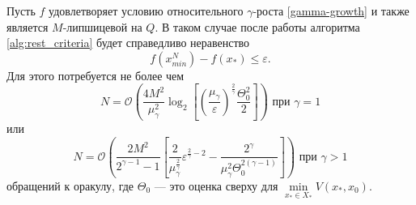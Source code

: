     \begin{theorem}
        Пусть $f$ удовлетворяет условию относительного $\gamma$-роста \eqref{gamma-growth} и также является $M$-липшицевой на $Q$. В таком случае после работы алгоритма \ref{alg:rest_criteria} будет справедливо неравенство
        \begin{equation}
            f(x_{min}^N) - f(x_*) \leq \varepsilon.
        \end{equation}
        Для этого потребуется не более чем
        \begin{equation}
           N = \mathcal{O} \left( \frac{4 M^2}{\mu_{\gamma}^2} \log_2{\left[\left(\frac{\mu_{\gamma}}{\varepsilon}\right)^{\frac{2}{\gamma}} \frac{\Theta_0^2}{2}\right]}\right) \text{ при } \gamma = 1
        \end{equation}
        или
        \begin{equation}
           N = \mathcal{O}\left( \frac{2 M^2 }{2^{\gamma - 1} - 1}\left[ \frac{2}{\mu_{\gamma}^{\frac{2}{\gamma}}}\varepsilon^{\frac{2}{\gamma} - 2} - \frac{2^{\gamma}}{\mu_{\gamma}^2 \Theta_0^{2(\gamma - 1)}} \right] \right) \text{ при } \gamma > 1
        \end{equation}
        обращений к оракулу, где $\Theta_0$ --- это оценка сверху для $\min\limits_{x_* \in X_*}{V(x_*, x_0)}$.
    \end{theorem}

